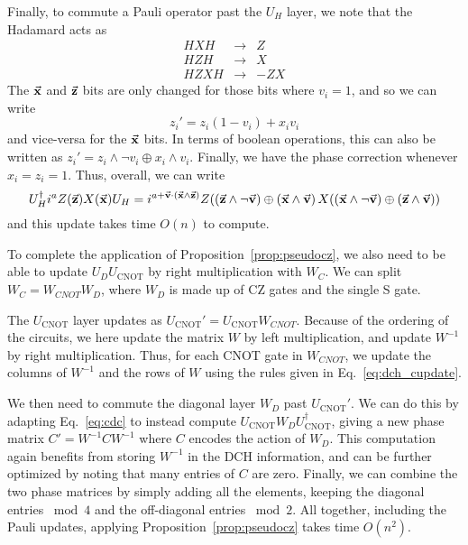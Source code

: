 Finally, to commute a Pauli operator past the $U_{H}$ layer, we note that the Hadamard acts as
\[
\begin{array}{rcc}
HXH & \rightarrow &Z\\
HZH & \rightarrow &X\\
HZXH & \rightarrow &-ZX
\end{array}
\]
The $\va{x}$ and $\va{z}$ bits are only changed for those bits where $v_{i}=1$, and so we can write
\[z_{i}' = z_{i}(1-v_{i}) + x_{i}v_{i}\]
and vice-versa for the $\va{x}$ bits. In terms of boolean operations, this can also be written as $z_{i}'= z_{i}\wedge\neg v_{i} \oplus x_{i}\wedge v_{i}$. Finally, we have the phase correction whenever $x_{i}=z_{i}=1$. Thus, overall, we can write
\begin{equation}
U_{H}^{\dagger}i^{a}Z(\va{z})X(\va{x})U_{H} = i^{a+\va{v}\cdot\left(\va{x}\wedge \va{z}\right)}Z(\left(\va{z}\wedge\neg \va{v}\right) \oplus \left(\va{x}\wedge \va{v}\right)X(\left(\va{x}\wedge \neg\va{v}\right)\oplus \left(\va{z}\wedge\va{v}\right))
\label{eq:dch_hupdate}
\end{equation}
and this update takes time $O(n)$ to compute.\par
To complete the application of Proposition~\ref{prop:pseudocz}, we also need to be able to update $U_{D}U_{\text{CNOT}}$ by right multiplication with $W_{C}$. We can split $W_{C}=W_{CNOT}W_{D}$, where $W_{D}$ is made up of CZ gates and the single S gate.\par
The $U_{\text{CNOT}}$ layer updates as $U_{\text{CNOT}}'=U_{\text{CNOT}}W_{CNOT}$. Because of the ordering of the circuits, we here update the matrix $W$ by left multiplication, and update $W^{-1}$ by right multiplication. Thus, for each CNOT gate in $W_{CNOT}$, we update the columns of $W^{-1}$ and the rows of $W$ using the rules given in Eq.~\ref{eq:dch_cupdate}.\par
We then need to commute the diagonal layer $W_{D}$ past $U_{\text{CNOT}}'$. We can do this by adapting Eq.~\ref{eq:cdc} to instead compute $U_{\text{CNOT}}W_{D}U_{\text{CNOT}}^{\dagger}$, giving a new phase matrix $C'=W^{-1}CW^{-1}$ where $C$ encodes the action of $W_{D}$. This computation again benefits from storing $W^{-1}$ in the DCH information, and can be further optimized by noting that many entries of $C$ are zero. Finally, we can combine the two phase matrices by simply adding all the elements, keeping the diagonal entries $\bmod 4$ and the off-diagonal entries $\bmod 2$. All together, including the Pauli updates, applying Proposition~\ref{prop:pseudocz} takes time $O(n^2)$.
